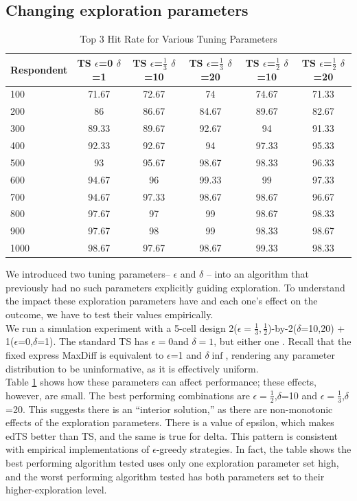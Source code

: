 \documentclass[nonblindrev]{informs3}
\begin{document}
\subsection{Changing exploration parameters}
\begin{table}
\begin{center}
\begin{tabular}{l | c | c | c | c | c }
 Respondent& TS $\epsilon$=0 $\delta$=1&  TS $\epsilon$=$\frac{1}{3}$ $\delta$=10  &TS $\epsilon$=$\frac{1}{3}$ $\delta$=20 & TS $\epsilon$=$\frac{1}{2}$ $\delta$=10 &TS $\epsilon$=$\frac{1}{2}$ $\delta$=20  \\
\hline
100	&	71.67	&	72.67	&	74	&	74.67	&	71.33	\\
200	&	86	&	86.67	&	84.67	&	89.67	&	82.67	\\
300	&	89.33	&	89.67	&	92.67	&	94	&	91.33	\\
400	&	92.33	&	92.67	&	94	&	97.33	&	95.33	\\
500	&	93	&	95.67	&	98.67	&	98.33	&	96.33	\\
600	&	94.67	&	96	&	99.33	&	99	&	97.33	\\
700	&	94.67	&	97.33	&	98.67	&	98.67	&	96.67	\\
800	&	97.67	&	97	&	99	&	98.67	&	98.33	\\
900	&	97.67	&	98	&	99	&	98.33	&	98.67	\\
1000	&	98.67	&	97.67	&	98.67	&	99.33	&	98.33	\\
\hline
\end{tabular}
\end{center}
\caption{Top 3 Hit Rate for Various Tuning Parameters}
\label{table:EDTS}
\end{table}
We introduced two tuning parameters– $\epsilon$ and $\delta$ –  into an algorithm that previously had no such parameters explicitly guiding exploration. To understand the impact these exploration parameters have and each one's effect on the outcome, we have to test their values empirically. \\
We run a simulation experiment with a 5-cell design 2($\epsilon=\frac{1}{3}, \frac{1}{2}$)-by-2($\delta$=10,20) + 1($\epsilon$=0,$\delta$=1).  The standard TS has $\epsilon=0$and $\delta=1$, but either one . Recall that the fixed express MaxDiff is equivalent to $\epsilon$=1 and $\delta\inf$, rendering any parameter distribution to be uninformative, as it is effectively uniform.\\
Table \ref{table:EDTS} shows how these parameters can affect performance; these effects, however, are small. The best performing combinations are $\epsilon=\frac{1}{2}$,$\delta$=10 and $\epsilon=\frac{1}{3}$,$\delta$=20. This suggests there is an ``interior solution,'' as there are non-monotonic effects of the exploration parameters. There is a value of epsilon, which makes edTS better than TS, and the same is true for delta. This pattern is consistent with empirical implementations of $\epsilon$-greedy strategies. In fact, the table shows the best performing algorithm tested uses only one exploration parameter set high, and the worst performing algorithm tested has both parameters set to their higher-exploration level.\\
\end{document}
